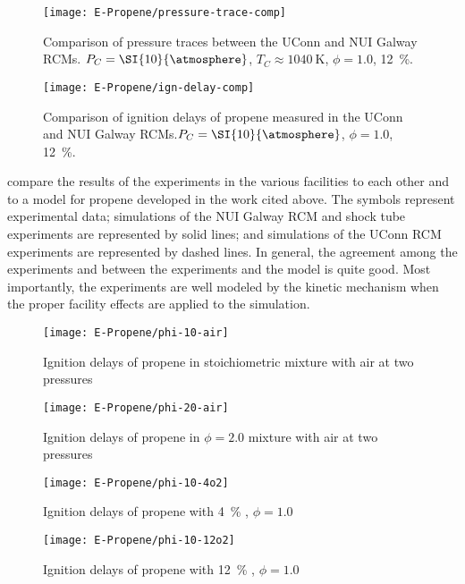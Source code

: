 \documentclass[../main.tex]{subfiles}
\begin{document}
\begin{figure}
    \begin{floatrow}
        \ffigbox
            {\texttt{[image: E-Propene/pressure-trace-comp]}}
            {\caption{Comparison of pressure traces between the UConn and
            NUI Galway RCMs. $P_C=\SI{10}{\atmosphere}$, $T_C\approx\SI{1040}{\kelvin}$,
            $\phi=1.0$, \SI{12}{\percent}.}
            \label{fig:pressure-trace-comp}}
        \ffigbox
            {\texttt{[image: E-Propene/ign-delay-comp]}}
            {\caption{Comparison of ignition delays of propene measured
            in the UConn and NUI Galway RCMs.$P_C=\SI{10}{\atmosphere}$,
            $\phi=1.0$, \SI{12}{\percent}.}
            \label{fig:ign-delay-comp}}
    \end{floatrow}
\end{figure}

 compare the results of the experiments in the
various facilities to each other and to a model for propene developed
in the work cited above. The symbols represent experimental data; simulations
of the NUI Galway RCM and shock tube experiments are represented by solid lines;
and simulations of the UConn RCM experiments are represented by dashed lines.
In general, the agreement among the experiments and between the experiments
and the model is quite good. Most importantly, the experiments are well
modeled by the kinetic mechanism when the proper facility effects are
applied to the simulation.

\begin{figure}
    \begin{floatrow}
        \ffigbox
            {\texttt{[image: E-Propene/phi-10-air]}}
            {\caption{Ignition delays of propene in stoichiometric
            mixture with air at two pressures}
            \label{fig:phi-10-air}}
        \ffigbox
            {\texttt{[image: E-Propene/phi-20-air]}}
            {\caption{Ignition delays of propene in $\phi=2.0$
            mixture with air at two pressures}
            \label{fig:phi-20-air}}
    \end{floatrow}
\end{figure}

\begin{figure}
    \begin{floatrow}
        \ffigbox
            {\texttt{[image: E-Propene/phi-10-4o2]}}
            {\caption{Ignition delays of propene with \SI{4}{\percent}
            , $\phi=1.0$}
            \label{fig:phi-10-4o2}}
        \ffigbox
            {\texttt{[image: E-Propene/phi-10-12o2]}}
            {\caption{Ignition delays of propene with \SI{12}{\percent}
            , $\phi=1.0$}
            \label{fig:phi-10-12o2}}
    \end{floatrow}
\end{figure}
\end{document}
